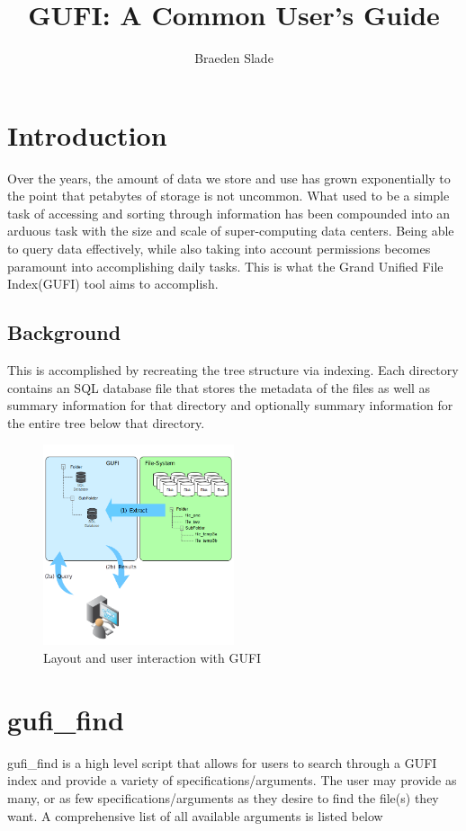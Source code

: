 \documentclass{article}
\title{GUFI: A Common User's Guide}
\author{Braeden Slade}
\begin{document}
\maketitle

\section{Introduction}
Over the years, the amount of data we store and use has grown exponentially to the point that petabytes of storage is not uncommon. What used to be a simple task of accessing and sorting through information has been compounded into an arduous task with the size and scale of super-computing data centers. Being able to query data effectively, while also taking into account permissions becomes paramount into accomplishing daily tasks. This is what the Grand Unified File Index(GUFI) tool aims to accomplish. 

\subsection{Background}
This is accomplished by recreating the tree structure via indexing. Each directory contains an SQL database file that stores the metadata of the files as well as summary information for that directory and optionally summary information for the entire tree below that directory. 

\begin{figure} [h]
\centering
\includegraphics[width=0.5\textwidth]{gufi_structure.png}
\caption{\label{fig:gufi\_structure}Layout and user interaction with GUFI}
\end{figure}

\clearpage

\section{gufi\_find}
gufi\_find is a high level script that allows for users to search through a GUFI index and provide a variety of specifications/arguments. The user may provide as many, or as few specifications/arguments as they desire to find the file(s) they want. A comprehensive list of all available arguments is listed below 
\end{document}
